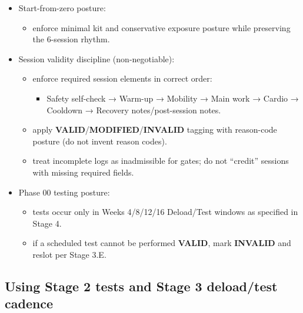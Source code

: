 \documentclass[10pt]{article}
\begin{document}
\begin{itemize}
\item Start-from-zero posture:
  \begin{itemize}
  \item enforce minimal kit and conservative exposure posture while preserving the 6-session rhythm.
  \end{itemize}
\item Session validity discipline (non-negotiable):
  \begin{itemize}
  \item enforce required session elements in correct order:
    \begin{itemize}
    \item Safety self-check → Warm-up → Mobility → Main work → Cardio → Cooldown → Recovery notes/post-session notes.
    \end{itemize}
  \item apply \textbf{VALID}/\textbf{MODIFIED}/\textbf{INVALID} tagging with reason-code posture (do not invent reason codes).
  \item treat incomplete logs as inadmissible for gates; do not “credit” sessions with missing required fields.
  \end{itemize}
\item Phase 00 testing posture:
  \begin{itemize}
  \item tests occur only in Weeks 4/8/12/16 Deload/Test windows as specified in Stage 4.
  \item if a scheduled test cannot be performed \textbf{VALID}, mark \textbf{INVALID} and reslot per Stage 3.E.
  \end{itemize}
\end{itemize}

\subsection*{Using Stage 2 tests and Stage 3 deload/test cadence}
{}
\end{document}
